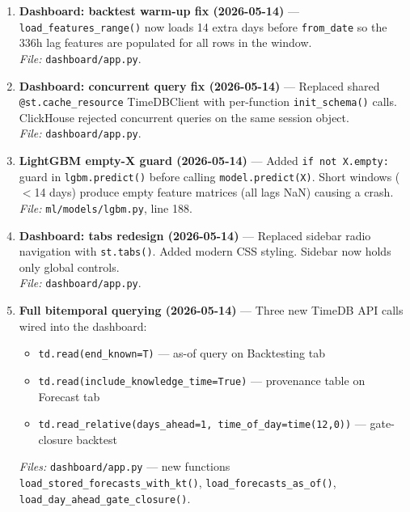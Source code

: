 \documentclass[12pt, a4paper, oneside]{memoir}
\newcommand{\code}[1]{\texttt{\footnotesize #1}}
\newcommand{\filepath}[1]{\textcolor{se3blue}{\texttt{\footnotesize #1}}}
\begin{document}
\begin{enumerate}[leftmargin=*, label=\textbf{Change \arabic*.}]
\item \textbf{Dashboard: backtest warm-up fix (2026-05-14)} --- \code{load\_features\_range()}
  now loads 14 extra days before \code{from\_date} so the 336h lag features are
  populated for all rows in the window.\\
  \textit{File:} \filepath{dashboard/app.py}.

\item \textbf{Dashboard: concurrent query fix (2026-05-14)} --- Replaced shared
  \code{@st.cache\_resource} TimeDBClient with per-function \code{init\_schema()} calls.
  ClickHouse rejected concurrent queries on the same session object.\\
  \textit{File:} \filepath{dashboard/app.py}.

\item \textbf{LightGBM empty-X guard (2026-05-14)} --- Added \code{if not X.empty:}
  guard in \code{lgbm.predict()} before calling \code{model.predict(X)}. Short windows
  ($<$14 days) produce empty feature matrices (all lags NaN) causing a crash.\\
  \textit{File:} \filepath{ml/models/lgbm.py}, line 188.

\item \textbf{Dashboard: tabs redesign (2026-05-14)} --- Replaced sidebar radio
  navigation with \code{st.tabs()}. Added modern CSS styling. Sidebar now holds only
  global controls.\\
  \textit{File:} \filepath{dashboard/app.py}.

\item \textbf{Full bitemporal querying (2026-05-14)} --- Three new TimeDB API calls
  wired into the dashboard:
  \begin{itemize}[noitemsep]
    \item \code{td.read(end\_known=T)} --- as-of query on Backtesting tab
    \item \code{td.read(include\_knowledge\_time=True)} --- provenance table on Forecast tab
    \item \code{td.read\_relative(days\_ahead=1, time\_of\_day=time(12,0))} --- gate-closure backtest
  \end{itemize}
  \textit{Files:} \filepath{dashboard/app.py} --- new functions
  \code{load\_stored\_forecasts\_with\_kt()}, \code{load\_forecasts\_as\_of()},
  \code{load\_day\_ahead\_gate\_closure()}.

\end{enumerate}

\end{document}
